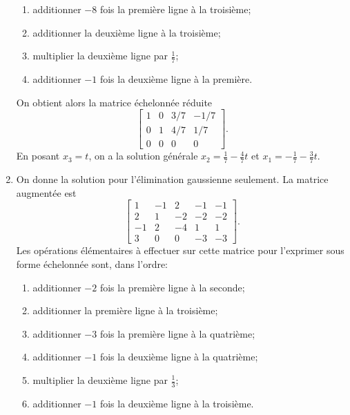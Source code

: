 \begin{exercice}
\begin{sol}
\begin{enumerate}
\begin{enumerate}[1.]
      \item additionner $-8$ fois la première ligne à la troisième;
      \item additionner la deuxième ligne à la troisième;
      \item multiplier la deuxième ligne par $\frac{1}{7}$;
      \item additionner $-1$ fois la deuxième ligne à la première.
      \end{enumerate}
      On obtient alors la matrice échelonnée réduite
      \begin{displaymath}
        \begin{bmatrix}
           1 &  0 & 3/7 & -1/7 \\
           0 &  1 & 4/7 & 1/7 \\
           0 &  0 &   0 &   0
         \end{bmatrix}.
      \end{displaymath}
      En posant $x_3 = t$, on a la solution générale $x_2 =
      \frac{1}{7} - \frac{4}{7}t$ et $x_1 = -\frac{1}{7} -
      \frac{3}{7}t$.
    \item On donne la solution pour l'élimination gaussienne
      seulement. La matrice augmentée est
      \begin{displaymath}
        \begin{bmatrix}
           1 & -1 &  2 & -1 & -1 \\
           2 &  1 & -2 & -2 & -2 \\
          -1 &  2 & -4 &  1 &  1 \\
           3 &  0 &  0 & -3 & -3
         \end{bmatrix}.
      \end{displaymath}
      Les opérations élémentaires à effectuer sur cette matrice pour
      l'exprimer sous forme échelonnée sont, dans l'ordre:
      \begin{enumerate}[1.]
      \item additionner $-2$ fois la première ligne à la seconde;
      \item additionner la première ligne à la troisième;
      \item additionner $-3$ fois la première ligne à la quatrième;
      \item additionner $-1$ fois la deuxième ligne à la quatrième;
      \item multiplier la deuxième ligne par $\frac{1}{3}$;
      \item additionner $-1$ fois la deuxième ligne à la troisième.
      \end{enumerate}

\end{enumerate}
\end{sol}
\end{exercice}
